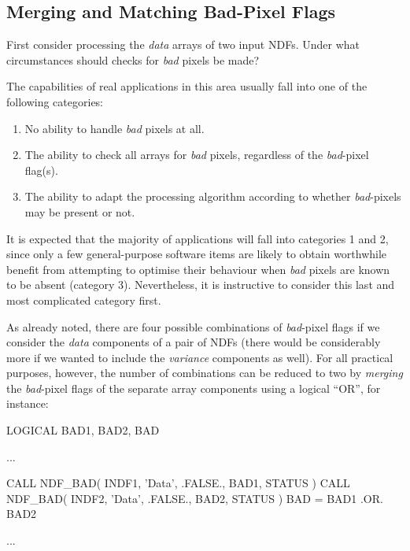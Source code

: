 \documentclass[twoside,11pt,nolof]{starlink}
\providecommand{\st}[1]{{\emph{#1}}}
\begin{document}
\subsection{\label{ss:mbad}Merging and Matching Bad-Pixel Flags}

First consider processing the \st{data\/} arrays of two input NDFs.
Under what circumstances should checks for \st{bad\/} pixels be made?

The capabilities of real applications in this area usually fall into one of
the following categories:

\begin{enumerate}

\item No ability to handle \st{bad\/} pixels at all.

\item The ability to check all arrays for \st{bad\/} pixels, regardless of
the \st{bad\/}-pixel flag(s).

\item The ability to adapt the processing algorithm according to whether
\st{bad\/}-pixels may be present or not.

\end{enumerate}

It is expected that the majority of applications will fall into categories 1
and 2, since only a few general-purpose software items are likely to obtain
worthwhile benefit from attempting to optimise their behaviour when
\st{bad\/} pixels are known to be absent (category 3).
Nevertheless, it is instructive to consider this last and most complicated
category first.

As already noted, there are four possible combinations of \st{bad\/}-pixel
flags if we consider the \st{data\/} components of a pair of NDFs (there
would be considerably more if we wanted to include the \st{variance\/}
components as well).
For all practical purposes, however, the number of combinations can be
reduced to two by \st{merging\/} the \st{bad\/}-pixel flags of the separate
array components using a logical ``OR'', for instance:

\small
\begin{terminalv}
      LOGICAL BAD1, BAD2, BAD

      ...

      CALL NDF_BAD( INDF1, 'Data', .FALSE., BAD1, STATUS )
      CALL NDF_BAD( INDF2, 'Data', .FALSE., BAD2, STATUS )
      BAD = BAD1 .OR. BAD2

      ...
\end{terminalv}
\normalsize
\end{document}
